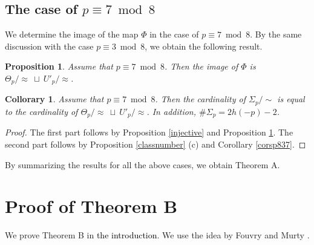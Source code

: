 \documentclass[a4paper, 11pt]{article}
\theoremstyle{plain}
\newtheorem{thm}[defn]{Theorem}
\newtheorem{prop}[defn]{Proposition}
\newtheorem{cor}[defn]{Collorary}
\newcommand{\?}{\textcolor{red}{??}}
\newcommand{\lm}{\lambda}
\newcommand{\bZ}{\mathbb{Z}}
\begin{document}
\subsection{The case of $p \equiv 7 \bmod 8$}
We determine the image of the map $\Phi$ in the case of $p \equiv 7 \bmod 8$. By the same discussion with the case $p \equiv 3 \bmod 8$, we obtain the following result.
\begin{prop}
\label{sur7}
Assume that $p \equiv 7 \bmod 8 $. Then the image of $\Phi$ is ${\Theta}_{p}/\approx \ \sqcup \ U'_p/\approx$. 
\end{prop}

\begin{cor}
\label{number7}
    Assume that $p \equiv 7 \bmod 8$. Then the cardinality of 
    ${\Sigma}_p /\sim$ is equal to the cardinality of ${\Theta}_{p} /\approx \ \sqcup \ U'_p / \approx$. In addition, $\# {\Sigma}_p=2h(-p)-2$.
\end{cor}
\begin{proof}
    The first part follows by Proposition \ref{injective} and Proposition \ref{sur7}. The second part follows by Proposition \ref{classnumber} (c) and Corollary \ref{corsp837}.
\end{proof}

By summarizing the results for all the above cases, we obtain Theorem A.

\section{Proof of Theorem B}
\label{theoremb}
    



We prove Theorem B in \textcolor{black}{the introduction}. We use the idea by Fouvry and Murty \cite[Theorem 4]{FM01}. 
\end{document}
